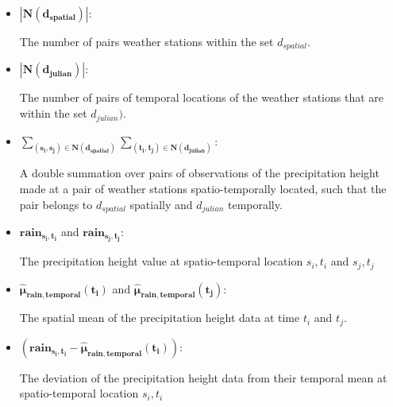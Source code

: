 \documentclass[
  12pt,
]{article}
\begin{document}
\begin{itemize}[label={}]
\begin{adjustwidth}{1cm}{0cm}
                \end{adjustwidth}
              \item $\mathbf{|N(d_{spatial})|}$:\\ 
                \begin{adjustwidth}{1cm}{0cm} The number of pairs weather stations within the set $d_{spatial}$.
                \end{adjustwidth}
              \item $\mathbf{|N(d_{julian})|}$:\\ 
                \begin{adjustwidth}{1cm}{0cm} The number of pairs of temporal locations of the weather stations that are within the set $d_{julian})$.
                \end{adjustwidth}
              \item ${\displaystyle\mathbf{\sum_{(s_i,s_j)\in N(d_{spatial})}\sum_{(t_i,t_j)\in N(d_{julian})}}}$:\\
                \begin{adjustwidth}{1cm}{0cm} A double summation over pairs of observations of the precipitation height made at a pair of weather stations spatio-temporally located, such that the pair belongs to $d_{spatial}$ spatially and $d_{julian}$ temporally.
                \end{adjustwidth}
              \item $\mathbf{rain_{s_{i},t_{i}}}$ and $\mathbf{rain_{s_{j},t_{j}}}$:\\ 
                \begin{adjustwidth}{1cm}{0cm} The precipitation height value at spatio-temporal location $s_{i},t_{i}$ and $s_{j},t_{j}$
                \end{adjustwidth}
              \item $\mathbf{\widehat{\mu}_{rain,temporal}(t_{i})}$ and $\mathbf{\widehat{\mu}_{rain,temporal}(t_{j})}$:\\
                \begin{adjustwidth}{1cm}{0cm} The spatial mean of the precipitation height data at time $t_{i}$ and $t_{j}$.
                \end{adjustwidth}
              \item $\mathbf{(rain_{s_{i},t_{i}} - \widehat{\mu}_{rain,temporal}(t_{i}))}$:\\ 
                \begin{adjustwidth}{1cm}{0cm} The deviation of the precipitation height data from their temporal mean at spatio-temporal location $s_{i},t_{i}$

\end{adjustwidth}
\end{itemize}
\end{document}
